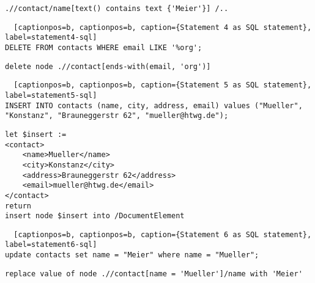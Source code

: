 \begin{lstlisting}[captionpos=b, caption={Statement 3 as XQuery code}, label=statement3-xquery] 
.//contact/name[text() contains text {'Meier'}] /..
\end{lstlisting} 


\begin{lstlisting} 	[captionpos=b, captionpos=b, caption={Statement 4 as SQL statement}, label=statement4-sql]
DELETE FROM contacts WHERE email LIKE '%org';
\end{lstlisting} 

\begin{lstlisting}[captionpos=b, caption={Statement 4 as XQuery code}, label=statement4-xquery] 
delete node .//contact[ends-with(email, 'org')]
\end{lstlisting} 





\begin{lstlisting} 	[captionpos=b, captionpos=b, caption={Statement 5 as SQL statement}, label=statement5-sql]
INSERT INTO contacts (name, city, address, email) values ("Mueller", "Konstanz", "Brauneggerstr 62", "mueller@htwg.de");
\end{lstlisting} 

\begin{lstlisting}[captionpos=b, caption={Statement 5 as XQuery code}, label=statement5-xquery] 
let $insert :=
<contact>
	<name>Mueller</name>
	<city>Konstanz</city>
	<address>Brauneggerstr 62</address>
	<email>mueller@htwg.de</email>
</contact>
return
insert node $insert into /DocumentElement
\end{lstlisting} 

\begin{lstlisting} 	[captionpos=b, captionpos=b, caption={Statement 6 as SQL statement}, label=statement6-sql]
update contacts set name = "Meier" where name = "Mueller";
\end{lstlisting} 

\begin{lstlisting}[captionpos=b, caption={Statement 6 as XQuery code}, label=statement6-xquery] 
replace value of node .//contact[name = 'Mueller']/name with 'Meier'
\end{lstlisting} 
